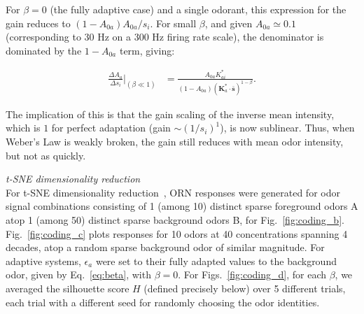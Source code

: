 \documentclass[10pt,prl,aps,showpacs,twocolumn,unsortedaddress,showkeys,linenumbers]{revtex4-1}
\begin{document}
{For $\beta = 0$ (the fully adaptive case) and a single odorant, this expression for the gain reduces to $(1 - A_{0a})A_{0a}/s_i$. For small $\beta$, and given $A_{0a} \simeq 0.1$ (corresponding to 30 Hz on a 300 Hz firing rate scale), the denominator is dominated by the $1 - A_{0a}$ term, giving:

\begin{align}
    \frac{\Delta A_a}
    {\Delta s_i}\bigg|_{(\beta \ll 1)}
    &=\frac{A_{0a}K^*_{ai}}
    {(1 - A_{0a})
    (\mathbf{K}^*_a\cdot 
    \bar {\mathbf{s}})^{1 - \beta}
    }.
\end{align}

The implication of this is that the gain scaling of the inverse mean intensity, which is $1$ for perfect adaptation (gain $\sim (1/s_i)^1$), is now sublinear. Thus, when Weber's Law is weakly broken, the gain still reduces with mean odor intensity, but not as quickly. \\

}

\textit{t-SNE dimensionality reduction} \\



For t-SNE dimensionality reduction~\cite{tsne}, ORN responses were generated for odor signal combinations consisting of 1 (among 10) distinct sparse foreground odors A atop 1 (among 50) distinct sparse background odors B, for Fig.~\ref{fig:coding_b}.  Fig.~\ref{fig:coding_c} plots responses for 10 odors at 40 concentrations spanning 4 decades, atop a random sparse background odor of similar magnitude. For adaptive systems, $\epsilon_a$ were set to their fully adapted values to the background odor, given by Eq.~\ref{eq:beta}, with $\beta = 0$. For Figs.~\ref{fig:coding_d}, for each $\beta$, we averaged the silhouette score $H$ (defined precisely below) over 5 different trials, each trial with a different seed for randomly choosing the odor identities. 
\end{document}
